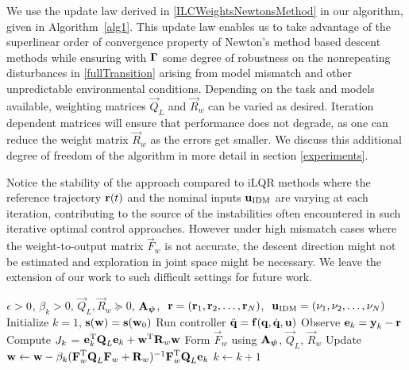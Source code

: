 We use the update law derived in \eqref{ILCWeightsNewtonsMethod} in our algorithm, given in Algorithm~\ref{alg1}. This update law enables us to take advantage of the superlinear order of convergence property of Newton's method based descent methods while ensuring with $\boldsymbol{\mathrm{\Gamma}}$ some degree of robustness on the nonrepeating disturbances in \eqref{fullTransition} arising from model mismatch and other unpredictable environmental conditions. Depending on the task and models available, weighting matrices $\vec{Q}_{L}$ and $\vec{R}_{w}$ can be varied as desired. Iteration dependent matrices will ensure that performance does not degrade, as one can reduce the weight matrix $\vec{R}_{w}$ as the errors get smaller. We discuss this additional degree of freedom of the algorithm in more detail in section \ref{experiments}.


Notice the stability of the approach compared to iLQR methods where the reference trajectory $\boldsymbol{\mathrm{r}}(t)$ and the nominal inputs $\boldsymbol{\mathrm{u}}_{\mathrm{IDM}}$ are varying at each iteration, contributing to the source of the instabilities often encountered in such iterative optimal control approaches. However under high mismatch cases where the weight-to-output matrix $\vec{F}_{w}$ is not accurate, the descent direction might not be estimated and exploration in joint space might be necessary. We leave the extension of our work to such difficult settings for future work.

\begin{algorithm}[tb]
   \caption{\alg}
   \label{alg1}
\begin{algorithmic}
    $\epsilon > 0$, $\beta_k > 0$, $\vec{Q}_L, \vec{R}_{w} \succeq 0$, $\boldsymbol{\mathrm{A}}_{\boldsymbol{\mathrm{\psi}}}$, $\ \boldsymbol{\mathrm{r}} = (\boldsymbol{\mathrm{r}}_1, \boldsymbol{\mathrm{r}}_2, \ldots, \boldsymbol{\mathrm{r}}_N)$, $\ \boldsymbol{\mathrm{u}}_{\mathrm{IDM}} = (\nu_1, \nu_2, \ldots, \nu_N)$
   \STATE Initialize $k = 1$, $\boldsymbol{\mathrm{s}}(\boldsymbol{\mathrm{w}}) = \boldsymbol{\mathrm{s}}(\boldsymbol{\mathrm{w}}_0)$
   \REPEAT 
 	   \STATE Run controller $\ddot{\boldsymbol{\mathrm{q}}} = \boldsymbol{\mathrm{f}}(\boldsymbol{\mathrm{q}},\dot{\boldsymbol{\mathrm{q}}},\boldsymbol{\mathrm{u}})$ %
 	   \STATE Observe $\boldsymbol{\mathrm{e}}_k = \boldsymbol{\mathrm{y}}_k - \boldsymbol{\mathrm{r}}$
 	   \STATE Compute $J_k$ = $\boldsymbol{\mathrm{e}}_k^{\mathrm{T}}\boldsymbol{\mathrm{Q}}_L\boldsymbol{\mathrm{e}}_k + \boldsymbol{\mathrm{w}}^{\mathrm{T}}\boldsymbol{\mathrm{R}}_w\boldsymbol{\mathrm{w}}$
 	   \STATE Form $\vec{F}_w$ using $\boldsymbol{\mathrm{A}}_{\boldsymbol{\mathrm{\psi}}}$, $\vec{Q}_L$, $\vec{R}_{w}$
 	   \STATE Update $\boldsymbol{\mathrm{w}} \leftarrow \boldsymbol{\mathrm{w}} - \beta_k(\boldsymbol{\mathrm{F}}_{w}^{\mathrm{T}}\boldsymbol{\mathrm{Q}}_L\boldsymbol{\mathrm{F}}_{w} + \boldsymbol{\mathrm{R}}_{w})^{-1}\boldsymbol{\mathrm{F}}_{w}^{\mathrm{T}}\boldsymbol{\mathrm{Q}}_L\boldsymbol{\mathrm{e}}_k$
 	   \STATE $k \leftarrow k + 1$
\end{algorithmic}
\end{algorithm}